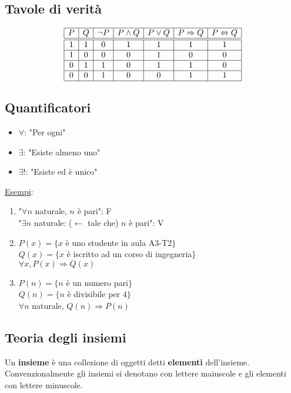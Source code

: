 \documentclass{article}
\newcommand{\ul}[1]{\underline{#1}}
\begin{document}
\subsection{Tavole di verità}
\begin{displaymath}
	\begin{array}{|c|c|c|c|c|c|c|c|c|c|c|}
		\hline
		P & Q & \neg P & P\wedge Q & P\vee Q & P\Rightarrow Q & P\Leftrightarrow Q \\
		\hline\hline
		1 & 1 & 0      & 1         & 1       & 1              & 1                  \\
		\hline
		1 & 0 & 0      & 0         & 1       & 0              & 0                  \\
		\hline
		0 & 1 & 1      & 0         & 1       & 1              & 0                  \\
		\hline
		0 & 0 & 1      & 0         & 0       & 1              & 1                  \\
		\hline
	\end{array}
\end{displaymath}
\subsection{Quantificatori}
\begin{itemize}
	\item $\forall$: "Per ogni"
	\item $\exists$: "Esiste almeno uno"
	\item $\exists!$: "Esiste ed è unico"
\end{itemize}

\ul{Esempi}:
\begin{enumerate}
	\item "$\forall n$ naturale, $n$ è pari": F\\
	      "$\exists n$ naturale: ($\leftarrow$ tale che) $n$ è pari": V
	\item $P(x)=\{x$ è uno studente in aula A3-T2$\}$\\
	      $Q(x)=\{x$ è iscritto ad un corso di ingegneria$\}$\\
	      $\forall x, P(x)\Rightarrow Q(x)$
	\item $P(n)=\{n$ è un numero pari$\}$\\
	      $Q(n)=\{n$ è divisibile per $4\}$\\
	      $\forall n$ naturale, $Q(n)\Rightarrow P(n)$
\end{enumerate}

\subsection{Teoria degli insiemi}
Un \textbf{insieme} è una collezione di oggetti detti \textbf{elementi} dell'insieme.\\
Convenzionalmente gli insiemi si denotano con lettere maiuscole e gli elementi con lettere minuscole.
\end{document}
